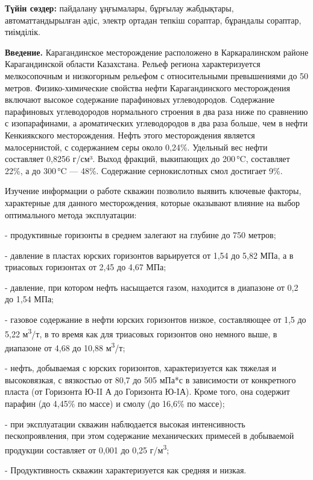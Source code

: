 {\bfseries Түйін сөздер:} пайдалану ұңғымалары, бұрғылау жабдықтары,
автоматтандырылған әдіс, электр ортадан тепкіш сораптар, бұрандалы
сораптар, тиімділік.

\begin{multicols}{2}
{\bfseries Введение.} Карагандинское месторождение расположено в
Каркаралинском районе Карагандинской области Казахстана. Рельеф
региона характеризуется мелкосопочным и низкогорным рельефом с
относительными превышениями до 50 метров.  Физико-химические свойства
нефти Карагандинского месторождения включают высокое содержание
парафиновых углеводородов. Содержание парафиновых углеводородов
нормального строения в два раза ниже по сравнению с изопарафинами, а
ароматических углеводородов в два раза больше, чем в нефти
Кенкиякского месторождения. Нефть этого месторождения является
малосернистой, с содержанием серы около 0,24\%. Удельный вес нефти
составляет 0,8256 г/см³. Выход фракций, выкипающих до 200 °C,
составляет 22\%, а до 300 °C — 48\%. Содержание сернокислотных смол
достигает 9\%.

Изучение информации о работе скважин позволило выявить ключевые факторы,
характерные для данного месторождения, которые оказывают влияние на
выбор оптимального метода эксплуатации:

- продуктивные горизонты в среднем залегают на глубине до 750 метров;

- давление в пластах юрских горизонтов варьируется от 1,54 до 5,82 МПа,
а в триасовых горизонтах от 2,45 до 4,67 МПа;

- давление, при котором нефть насыщается газом, находится в диапазоне от
0,2 до 1,54 МПа;

- газовое содержание в нефти юрских горизонтов низкое, составляющее от
1,5 до 5,22 м\textsuperscript{3}/т, в то время как для триасовых
горизонтов оно немного выше, в диапазоне от 4,68 до 10,88
м\textsuperscript{3}/т;

- нефть, добываемая с юрских горизонтов, характеризуется как тяжелая и
высоковязкая, с вязкостью от 80,7 до 505 мПа*с в зависимости от
конкретного пласта (от Горизонта Ю-II А до Горизонта Ю-IА). Кроме
того, она содержит парафин (до 4,45\% по массе) и смолу (до 16,6\% по
массе);

- при эксплуатации скважин наблюдается высокая интенсивность
пескопроявления, при этом содержание механических примесей в
добываемой продукции составляет от 0,001 до 0,25
г/м\textsuperscript{3};

- Продуктивность скважин характеризуется как средняя и низкая.


\end{multicols}
